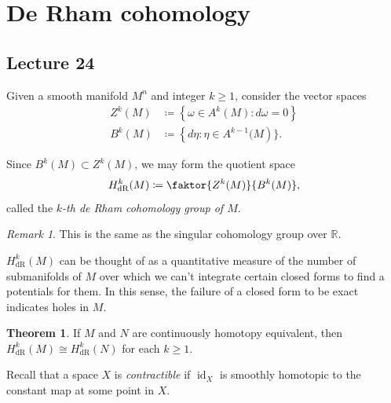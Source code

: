 \documentclass[10pt,letterpaper,cm]{nupset}
\theoremstyle{definition}
\theoremstyle{theorem}
\newtheorem{theorem}[definition]{Theorem}
\theoremstyle{remark}
\newtheorem{remark}[definition]{Remark}
\newcommand{\R}{\mathbb R}
\newcommand{\1}{\mathbf{1}}
\newcommand{\0}{\vec 0}
\DeclareMathOperator{\id}{id}
\DeclareMathOperator{\dr}{dR}
\begin{document}
\section{De Rham cohomology}

\subsection{Lecture 24}


Given a smooth manifold $M^n$ and integer $k\geq 1$, consider the vector spaces
\begin{align*}
  Z^k(M) &  \coloneqq \left\{\omega \in A^k(M) : d\omega =0\right\}
 \\  B^k(M) & \coloneqq \left\{ d\eta : \eta \in A^{k-1}(M\right)\}.
 \end{align*}

 Since $B^k(M) \subset Z^k(M)$, we may form the quotient space $$ H_{\dr}^k(M) \coloneqq  \faktor{Z^k(M)}{B^k(M)},$$ called the \textit{$k$-th de Rham cohomology group of $M$}.

\smallskip

\begin{remark}
This is the same as the singular cohomology group over $\R$.
\end{remark}

\smallskip

$H_{\dr}^k(M)$ can be thought of as a quantitative measure of the number of submanifolds of $M$ over which we can't integrate certain closed forms to find a potentials for them. In this sense, the failure of a closed form to be exact indicates holes in $M$.

\smallskip

\begin{theorem}
If $M$ and $N$ are continuously homotopy equivalent, then $H_{\dr}^k(M) \cong H_{\dr}^k(N)$ for each $k\geq 1$.
\end{theorem}

\medskip

Recall that a space $X$ is \textit{contractible} if $\id_X$ is smoothly homotopic to the constant map at some point in $X$. 
\end{document}
